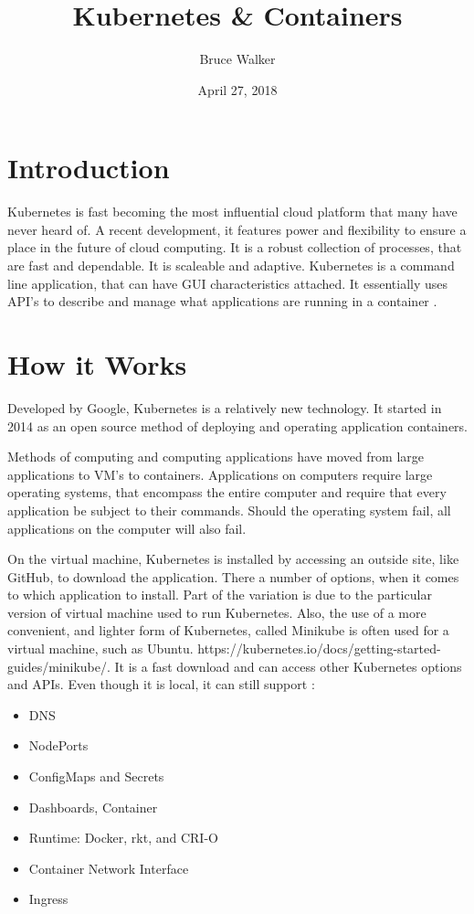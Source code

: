 \documentclass[12pt, letterpaper]{article}
\title{Kubernetes \& Containers}
\author{Bruce Walker}
\date{ April 27, 2018}
\begin{document}
\maketitle 

\section*{Introduction}
\setlength{\parskip}{1em}
\indent 
Kubernetes is fast becoming the most influential cloud platform that many have never heard of.  A recent development, it features power and flexibility to ensure a place in the future of cloud computing.  It is a robust collection of processes, that are fast and dependable.  It is scaleable and adaptive. Kubernetes is a command line application, that can have GUI characteristics attached.  It essentially uses API's to describe and manage what applications are running in a container  \cite{hid-sp18-525-concept}.

\section *{How it Works}
\setlength{\parskip}{1.3em}

Developed by Google, Kubernetes is a relatively new technology.  It started in 2014 as an open source method of deploying and operating application containers.  

Methods of computing and computing applications have moved from large applications to VM's to containers.  Applications on computers require large operating systems, that encompass the entire computer and require that every application be subject to their commands.  Should the operating system fail, all applications on the computer will also fail.  

On the virtual machine, Kubernetes is installed by accessing an outside site, like GitHub, to download the application.  There a number of options, when it comes to which application to install.  Part of the variation is due to the particular version of virtual machine used to run Kubernetes.  Also, the use of a more convenient, and lighter form of Kubernetes, called Minikube is often used for a virtual machine, such as Ubuntu. https://kubernetes.io/docs/getting-started-guides/minikube/.  It is a fast download and can access other Kubernetes options and APIs.  Even though it is local, it can still support \cite{hid-sp18-525-concept}:
\begin{itemize}
    \item DNS 
    
    \item NodePorts 
    
    \item ConfigMaps and Secrets 
    
    \item Dashboards, Container 
    
    \item Runtime:  Docker, rkt, and CRI-O 
    
    \item Container Network Interface
    
    \item Ingress  
 \end{itemize}   
 
\end{document}
